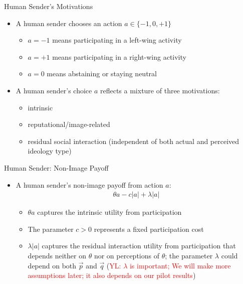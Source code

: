 \documentclass[9pt,aspectratio=1610]{beamer}
\begin{document}
\begin{frame}{Human Sender's Motivations}

\begin{itemize}\setlength{\itemsep}{1em}
    \item A human sender chooses an action $a\in \{-1,0,+1\}$
    \begin{itemize}
        \item $a=-1$ means participating in a left-wing activity
        \item $a=+1$ means participating in a right-wing activity
        \item $a=0$ means abstaining or staying neutral
    \end{itemize}
    \item A human sender's choice $a$ reflects a mixture of three motivations:
    \begin{itemize}
        \item intrinsic
        \item reputational/image-related
        \item residual social interaction (independent of both actual and perceived ideology type) %
    \end{itemize}
\end{itemize}  
\end{frame}



\begin{frame}{Human Sender: Non-Image Payoff}
\begin{itemize}\setlength{\itemsep}{1em}
    \item A human sender's \textcolor{orange0}{non-image payoff} from action $a$:
    \begin{align*}
        \theta a  - c|a| + \lambda |a|
    \end{align*}
    \begin{itemize}
        \item $\theta a$ captures the intrinsic utility from participation
        \item The parameter $c>0$ represents a fixed participation cost
        \item $\lambda |a|$ captures the residual interaction utility from participation that depends neither on $\theta$ nor on perceptions of $\theta$; the parameter $\lambda$ could depend on both $\vec{p}$ and $\vec{q}$ (\textcolor{red}{YL: $\lambda$ is important; We will make more assumptions later; it also depends on our pilot results})
    \end{itemize}
\end{itemize}
\end{frame}
\end{document}
